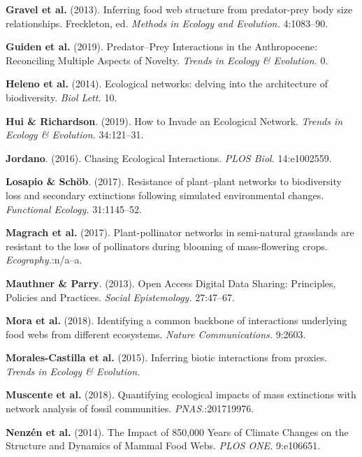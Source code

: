 \leavevmode\hypertarget{ref-GravPois13}{}%
\textbf{Gravel et al.} (2013). Inferring food web structure from
predator-prey body size relationships. Freckleton, ed. \emph{Methods in
Ecology and Evolution.} 4:1083--90.

\leavevmode\hypertarget{ref-GuidBart19}{}%
\textbf{Guiden et al.} (2019). Predator--Prey Interactions in the
Anthropocene: Reconciling Multiple Aspects of Novelty. \emph{Trends in
Ecology \& Evolution.} 0.

\leavevmode\hypertarget{ref-HeleGarc14}{}%
\textbf{Heleno et al.} (2014). Ecological networks: delving into the
architecture of biodiversity. \emph{Biol Lett.} 10.

\leavevmode\hypertarget{ref-HuiRich19}{}%
\textbf{Hui \& Richardson}. (2019). How to Invade an Ecological Network.
\emph{Trends in Ecology \& Evolution.} 34:121--31.

\leavevmode\hypertarget{ref-Jord16}{}%
\textbf{Jordano}. (2016). Chasing Ecological Interactions. \emph{PLOS
Biol.} 14:e1002559.

\leavevmode\hypertarget{ref-LosaScho17}{}%
\textbf{Losapio \& Schöb}. (2017). Resistance of plant--plant networks
to biodiversity loss and secondary extinctions following simulated
environmental changes. \emph{Functional Ecology.} 31:1145--52.

\leavevmode\hypertarget{ref-MagrHolz17}{}%
\textbf{Magrach et al.} (2017). Plant-pollinator networks in
semi-natural grasslands are resistant to the loss of pollinators during
blooming of mass-flowering crops. \emph{Ecography.}:n/a--a.

\leavevmode\hypertarget{ref-MautParr13}{}%
\textbf{Mauthner \& Parry}. (2013). Open Access Digital Data Sharing:
Principles, Policies and Practices. \emph{Social Epistemology.}
27:47--67.

\leavevmode\hypertarget{ref-MoraGrav18}{}%
\textbf{Mora et al.} (2018). Identifying a common backbone of
interactions underlying food webs from different ecosystems.
\emph{Nature Communications.} 9:2603.

\leavevmode\hypertarget{ref-MoraMati15}{}%
\textbf{Morales-Castilla et al.} (2015). Inferring biotic interactions
from proxies. \emph{Trends in Ecology \& Evolution.}

\leavevmode\hypertarget{ref-MuscPrab18}{}%
\textbf{Muscente et al.} (2018). Quantifying ecological impacts of mass
extinctions with network analysis of fossil communities.
\emph{PNAS.}:201719976.

\leavevmode\hypertarget{ref-NenzMont14}{}%
\textbf{Nenzén et al.} (2014). The Impact of 850,000 Years of Climate
Changes on the Structure and Dynamics of Mammal Food Webs. \emph{PLOS
ONE.} 9:e106651.

